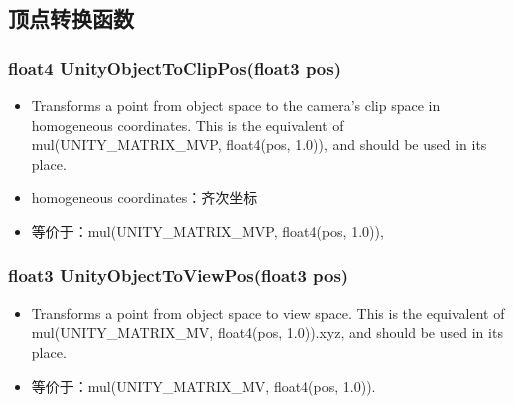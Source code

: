 \documentclass[9pt, b5paper]{article}
\begin{document}
\subsection{顶点转换函数}
\label{sec-1-2}
\subsubsection{float4 UnityObjectToClipPos(float3 pos)}
\label{sec-1-2-1}
\begin{itemize}
\item Transforms a point from object space to the camera’s clip space in homogeneous coordinates. This is the equivalent of mul(UNITY\_MATRIX\_MVP, float4(pos, 1.0)), and should be used in its place.
\item homogeneous coordinates：齐次坐标
\item 等价于：mul(UNITY\_MATRIX\_MVP, float4(pos, 1.0)),
\end{itemize}
\subsubsection{float3 UnityObjectToViewPos(float3 pos)}
\label{sec-1-2-2}
\begin{itemize}
\item Transforms a point from object space to view space. This is the equivalent of mul(UNITY\_MATRIX\_MV, float4(pos, 1.0)).xyz, and should be used in its place.
\item 等价于：mul(UNITY\_MATRIX\_MV, float4(pos, 1.0)).
\end{itemize}
\end{document}
